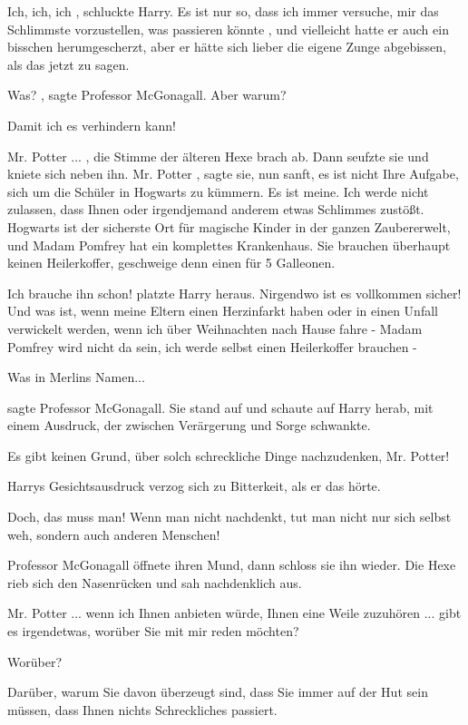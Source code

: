 \glqq Ich, ich, ich\grqq{} , schluckte Harry. \glqq Es ist nur so, dass ich
immer versuche, mir das Schlimmste vorzustellen, was passieren könnte\grqq{}
, und vielleicht hatte er auch ein bisschen herumgescherzt, aber er hätte
sich lieber die eigene Zunge abgebissen, als das jetzt zu sagen.

\glqq Was?\grqq{} , sagte Professor McGonagall. \glqq Aber warum?\grqq{}

\glqq Damit ich es verhindern kann!\grqq{}

\glqq Mr. Potter ...\grqq{} , die Stimme der älteren Hexe brach ab. Dann seufzte
sie und kniete sich neben ihn. \glqq Mr. Potter\grqq{} , sagte sie, nun
sanft, \glqq es ist nicht Ihre Aufgabe, sich um die Schüler in Hogwarts zu
kümmern. Es ist meine. Ich werde nicht zulassen, dass Ihnen oder
irgendjemand anderem etwas Schlimmes zustößt. Hogwarts ist der sicherste Ort
für magische Kinder in der ganzen Zaubererwelt, und Madam Pomfrey hat ein
komplettes Krankenhaus. Sie brauchen überhaupt keinen Heilerkoffer,
geschweige denn einen für 5 Galleonen.\grqq{}

\glqq Ich brauche ihn schon!\grqq{} platzte Harry heraus. \glqq Nirgendwo ist es
vollkommen sicher! Und was ist, wenn meine Eltern einen Herzinfarkt haben
oder in einen Unfall verwickelt werden, wenn ich über Weihnachten nach Hause
fahre - Madam Pomfrey wird nicht da sein, ich werde selbst einen
Heilerkoffer brauchen -\grqq{}

\glqq Was in Merlins Namen...\grqq{}

sagte Professor McGonagall. Sie stand auf und schaute auf Harry herab, mit einem
Ausdruck, der zwischen Verärgerung und Sorge schwankte.

\glqq Es gibt keinen Grund, über solch schreckliche Dinge nachzudenken, Mr.
Potter!\grqq{}

Harrys Gesichtsausdruck verzog sich zu Bitterkeit, als er das hörte.

\glqq Doch, das muss man! Wenn man nicht nachdenkt, tut man nicht nur sich
selbst weh, sondern auch anderen Menschen!\grqq{}

Professor McGonagall öffnete ihren Mund, dann schloss sie ihn wieder. Die Hexe
rieb sich den Nasenrücken und sah nachdenklich aus.

\glqq Mr. Potter ... wenn ich Ihnen anbieten würde, Ihnen eine Weile zuzuhören
... gibt es irgendetwas, worüber Sie mit mir reden möchten?\grqq{}

\glqq Worüber?\grqq{}

\glqq Darüber, warum Sie davon überzeugt sind, dass Sie immer auf der Hut sein
müssen, dass Ihnen nichts Schreckliches passiert.\grqq{}

